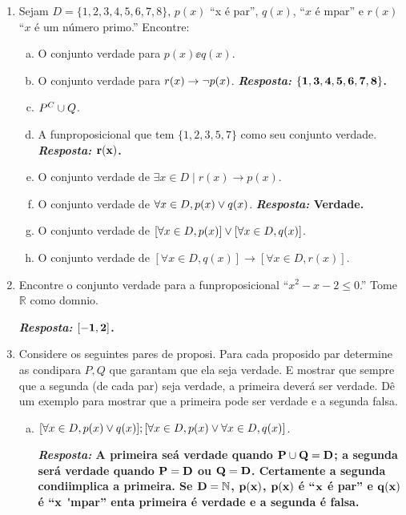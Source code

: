\begin{enumerate}[{\bf 1.}]
\item Sejam $D=\{1,2,3,4,5,6,7,8\}$, $p(x)$ ``x \'e par'', $q(x)$, ``$x$ \'e \ih mpar'' e $r(x)$ ``$x$ \'e um n\'umero primo.'' Encontre:
\begin{enumerate}[a)]
\item O conjunto verdade para $p(x)\ee q(x)$.
\item O conjunto verdade para $r(x)\to\lnot p(x)$.  {\bf{\it Resposta:} ${\bf \{1,3,4,5,6,7,8\}}$.}
\item $P^C\cup Q$.
\item A fun\cao proposicional que tem $\{1,2,3,5,7\}$ como seu conjunto verdade. {\bf{\it Resposta:} ${\bf r(x)}$.}
\item O conjunto verdade de $\exists x \in D \mid  r(x)\to p(x)$.
\item O conjunto verdade de $\forall x\in D, p(x)\vee q(x)$. {\bf{\it Resposta:} Verdade.}
\item O conjunto verdade de $[\forall x\in D, p(x)]\vee[\forall x\in D, q(x)]$. 
\item O conjunto verdade de $[\forall x\in D, q(x)]\to[\forall x\in D, r(x)]$.
\end{enumerate}

\item Encontre o conjunto verdade para a fun\cao proposicional ``$x^2-x-2\leq 0$.'' Tome $\mathbb{R}$ como dom\ih nio.

{\bf{\it Resposta:} ${\bf [-1,2]}$.}

\item Considere os seguintes pares de proposi\cois. Para cada proposi\cao do par determine as condi\coes para $P,Q$ que garantam que ela seja verdade. E mostrar que sempre que a segunda (de cada par) seja verdade, a primeira dever\'a ser verdade. D\^e um exemplo para mostrar que a primeira pode ser verdade e a segunda falsa.
\begin{enumerate}[a)]
\item $[\forall x\in D, p(x)\vee q(x)]; [\forall x\in D, p(x) \vee \forall x \in D, q(x)]$.

{\bf{\it Resposta:} A primeira se\'a verdade quando ${\bf P\cup Q=D}$; a segunda ser\'a verdade quando ${\bf P=D}$ ou ${\bf Q=D}$. Certamente a segunda condi\cao implica a primeira. Se ${\bf D=\mathbb{N}}$, ${\bf p(x)}$, ${\bf p(x)}$ \'e ``${\bf x}$ \'e par'' e ${\bf q(x)}$ \'e ``${\bf x}$ \' \ih mpar'' ent\ao a primeira \'e verdade e a segunda \'e falsa.}


\end{enumerate}
\end{enumerate}
